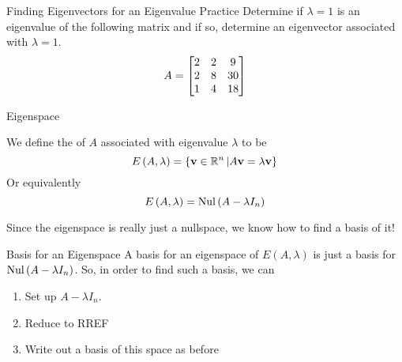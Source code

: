 \documentclass[xcoler=dvipsnames, aspectratio=169]{beamer}
\begin{document}
    \begin{frame}{Finding Eigenvectors for an Eigenvalue Practice}
        Determine if $\lambda=1$ is an eigenvalue of the following matrix and if so, determine
        an eigenvector associated with $\lambda=1$.
        \[
            A = \begin{bmatrix}
                2 & 2 & 9\\
                2 & 8 &30\\
                1 & 4 &18
            \end{bmatrix}
        \]
        \iftoggle{showSolutions}{
            \pause
            \[
                \left(1,\bMat{-1\\-4\\1}\right)
            \]
            is an eigenpair. See that\pause
            \[
                A\vec{v} = \bMat{
                    2 & 2 & 9\\
                    2 & 8 &30\\
                    1 & 4 &18
                }\bMat{-1\\-4\\1}\pause = -\bMat{2\\2\\1}-4\bMat{2\\8\\4}+\bMat{9\\30\\18}
                \pause = \bMat{-2-8+9\\-2-32+30\\-1-16+18} = \bMat{
                    -1\\
                    -4\\
                    1
                }\pause = 1\vec{v}
            \]
        }{
            \vspace{130pt}
        }
    \end{frame}
    \begin{frame}{Eigenspace}
        \begin{defn}
            We define the  of $A$ associated with eigenvalue $\lambda$ to be
            \[
                E\left(A,\lambda\right) = \left\{\mathbf{v}\in\mathbb{R}^n\left|A\mathbf{v} = \lambda\mathbf{v}\right\}\right.
            \]\pause
            Or equivalently
            \[
                E\left(A,\lambda\right) = \mathrm{Nul}\left(A-\lambda I_n\right)
            \]\pause
        \end{defn}
        Since the eigenspace is really just a nullspace, we know how to find a basis of it!
    \end{frame}
    \begin{frame}{Basis for an Eigenspace}
        A basis for an eigenspace of $E(A,\lambda)$ is just a basis for $\mathrm{Nul}\left(A-\lambda I_n\right)$.
        So, in order to find such a basis, we can
        \begin{enumerate}
            \pause\item Set up $A-\lambda I_n$.
            \pause\item Reduce to RREF
            \pause\item Write out a basis of this space as before
        \end{enumerate}
    \end{frame}
\end{document}
